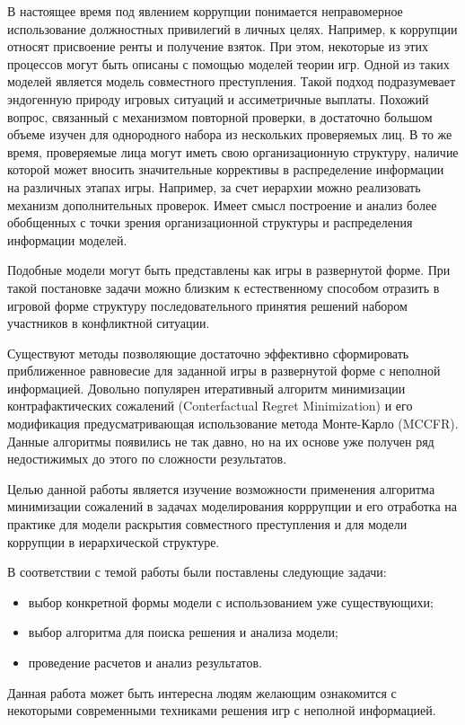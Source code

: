 \Introduction

\par
В настоящее время под явлением коррупции понимается неправомерное использование должностных привилегий в личных целях. Например, к коррупции относят присвоение ренты и получение взяток. При этом, некоторые из этих процессов могут быть описаны с помощью моделей теории игр. Одной из таких моделей является модель совместного преступления\cite{Spengler}. Такой подход подразумевает эндогенную природу игровых ситуаций и ассиметричные выплаты. Похожий вопрос, связанный с механизмом повторной проверки, в достаточно большом объеме изучен для однородного набора из нескольких проверяемых лиц\cite{Kumacheva}. В то же время, проверяемые лица могут иметь свою организационную структуру, наличие которой может вносить значительные коррективы в распределение информации на различных этапах игры. Например, за счет иерархии можно реализовать механизм дополнительных проверок\cite{Orlov}. Имеет смысл построение и анализ более обобщенных с точки зрения организационной структуры и распределения информации моделей.
\par
Подобные модели могут быть представлены как игры в развернутой форме. При такой постановке задачи можно близким к естественному способом отразить в игровой форме структуру последовательного принятия решений набором участников в конфликтной ситуации.
\par
Существуют методы позволяющие достаточно эффективно сформировать приближенное равновесие для заданной игры в развернутой форме с неполной информацией. Довольно популярен итеративный алгоритм минимизации контрафактических сожалений (Conterfactual Regret Minimization)\cite{NIPS07cfr} и его модификация предусматривающая использование метода Монте-Карло (MCCFR)\cite{MCCFR}.  Данные алгоритмы появились не так давно, но на их основе уже получен ряд недостижимых до этого по сложности результатов.
\par
Целью данной работы является изучение возможности применения алгоритма минимизации сожалений в задачах моделирования корррупции и его отработка на практике для модели раскрытия совместного преступления и для модели коррупции в иерархической структуре.
\par
В соответствии с темой работы были поставлены следующие задачи:
\begin{itemize}
	\item выбор конкретной формы модели с использованием уже существующихи;
	\item выбор алгоритма для поиска решения и анализа модели;
	\item проведение расчетов и анализ результатов.
\end{itemize}
\par
Данная работа может быть интересна людям желающим ознакомится с некоторыми современными техниками решения игр с неполной информацией.
